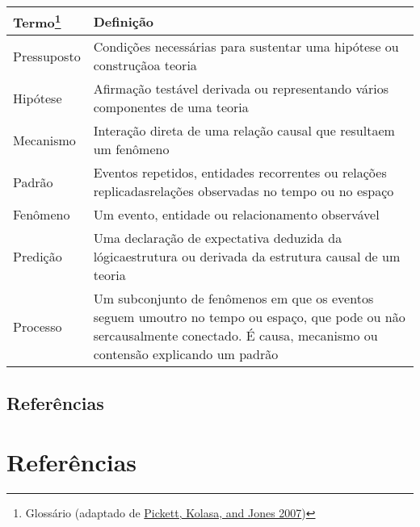\documentclass[
]{article}
\begin{document}
\begin{longtable}[]{@{}
  >{\raggedright\arraybackslash}p{}
  >{\raggedright\arraybackslash}p{}@{}}
\toprule
Termo\footnote{Glossário (adaptado de \protect\hyperlink{ref-pickett_ecological_2007}{Pickett, Kolasa, and Jones 2007})} & Definição \\
\midrule
\endhead
Pressuposto & Condições necessárias para sustentar uma hipótese ou construçãoa teoria \\
Hipótese & Afirmação testável derivada ou representando vários componentes de uma teoria \\
Mecanismo & Interação direta de uma relação causal que resultaem um fenômeno \\
Padrão & Eventos repetidos, entidades recorrentes ou relações replicadasrelações observadas no tempo ou no espaço \\
Fenômeno & Um evento, entidade ou relacionamento observável \\
Predição & Uma declaração de expectativa deduzida da lógicaestrutura ou derivada da estrutura causal de um teoria \\
Processo & Um subconjunto de fenômenos em que os eventos seguem umoutro no tempo ou espaço, que pode ou não sercausalmente conectado. É causa, mecanismo ou contensão explicando um padrão \\
\bottomrule
\end{longtable}

\hypertarget{referuxeancias}{%
\subsection{Referências}\label{referuxeancias}}

\hypertarget{referuxeancias-1}{%
\section*{Referências}\label{referuxeancias-1}}
\end{document}

